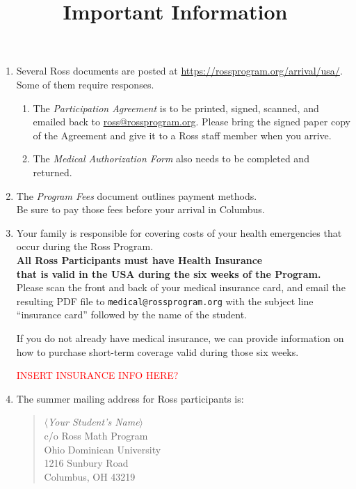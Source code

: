 \documentclass[11pt]{ross}
\title{Important Information}
\newcommand{\spa}{\hspace*{1cm}}
\newcommand{\spz}{\hspace*{5mm}}
\begin{document}
\maketitle
 \begin{enumerate}[label=(\arabic*),itemsep=2em,topsep=-1em]
\item Several Ross documents are posted at \url{https://rossprogram.org/arrival/usa/}.  \\
Some of them require responses.  
 \begin{enumerate}[label=(\alph*),itemsep=0.5em,topsep=0em]
\item The {\it Participation Agreement} is to be printed, signed, scanned, and emailed back to 
\href{mailto:ross@rossprogram.org}{ross@rossprogram.org}.  Please bring the signed paper copy of the Agreement and give it to a Ross staff member when you arrive. 
\item The {\it Medical Authorization Form} also needs to be completed and returned.
\end{enumerate}

\item The \textit{Program Fees} document outlines payment methods.  \\
\spa Be sure to pay those fees before your arrival in Columbus.

\item Your family is responsible for covering costs of your health
emergencies that occur during the Ross Program.\\
\spz  \textbf{All Ross Participants must have Health Insurance \\
\spz that is valid in the USA during the six weeks of the Program.} \\[5pt]
   Please scan the front and back of your medical insurance card, and email the resulting PDF file to
\texttt{medical@rossprogram.org} with the subject line ``insurance card''
followed by the name of the student. 

If you do not already have medical insurance, we can provide information on how to purchase short-term coverage valid during those six weeks.

 \hspace*{3cm}  \textcolor{red}{INSERT INSURANCE INFO HERE? }

\item The summer mailing address for Ross participants is:
\begin{quote}
\textit{$\langle$Your Student's Name$\rangle$} \\
c/o Ross Math Program\\
Ohio Dominican University \\
1216 Sunbury Road \\
Columbus, OH 43219
\end{quote}


\end{enumerate}
\end{document}
